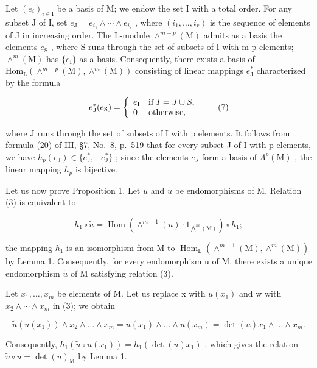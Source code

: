 Let \((e_{i})_{i\in\mathrm{I}}\) be a basis of M; we endow the set I with a total order. For any subset J of I, set \(e_{\mathrm{J}}=e_{i_{1}}\wedge\cdots\wedge e_{i_{r}}\) , where \((i_{1},\ldots,i_{r})\) is the sequence of elements of J in increasing order. The L-module \(\wedge^{m-p}(\mathrm{M})\) admits as a basis the elements \(e_{\mathrm{S}}\) , where S runs through the set of subsets of I with m-p elements; \(\wedge^{m}(\mathrm{M})\) has \(\{e_{\mathrm{I}}\}\) as a basis. Consequently, there exists a basis of \(\mathrm{Hom}_{\mathrm{L}}(\wedge^{m-p}(\mathrm{M}),\wedge^{m}(\mathrm{M}))\) consisting of linear mappings \(e_{\mathrm{J}}^{*}\) characterized by the formula

\[
e _ {\mathrm{J}} ^ {*} (e _ {\mathrm{S}}) = \left\{ \begin{array}{l l} e _ {\mathrm{I}} & \text {if } I = J\cup S, \\ 0 & \text {otherwise}, \end{array} \right.\tag{7}
\]

where J runs through the set of subsets of I with p elements. It follows from formula (20) of III, §7, No.~8, p.~519 that for every subset J of I with p elements, we have \(h_{p}(e_{\mathrm{J}}) \in \{e_{\mathrm{J}}^{*}, -e_{\mathrm{J}}^{*}\}\) ; since the elements \(e_{J}\) form a basis of \(\Lambda^{p}(\mathrm{M})\) , the linear mapping \(h_{p}\) is bijective.

Let us now prove Proposition 1. Let \(u\) and \(\widetilde{u}\) be endomorphisms of M. Relation (3) is equivalent to

\[
h _ {1} \circ \widetilde {u} = \operatorname{Hom} (\wedge^ {m - 1} (u) \cdot 1 _ {\bigwedge^ {m} (\mathrm{M})}) \circ h _ {1};\tag{8}
\]

the mapping \(h_{1}\) is an isomorphism from M to \(\operatorname{Hom}_{\mathrm{L}}(\wedge^{m-1}(\mathrm{M}),\wedge^{m}(\mathrm{M}))\) by Lemma 1. Consequently, for every endomorphism u of M, there exists a unique endomorphism \(\widetilde{u}\) of M satisfying relation (3).

Let \(x_{1},\ldots,x_{m}\) be elements of M. Let us replace x with \(u(x_{1})\) and w with \(x_{2}\wedge\cdots\wedge x_{m}\) in (3); we obtain

\[
\widetilde {u} (u (x _ {1})) \wedge x _ {2} \wedge \dots \wedge x _ {m} = u (x _ {1}) \wedge \dots \wedge u (x _ {m}) = \det (u) x _ {1} \wedge \dots \wedge x _ {m}.
\]

Consequently, \(h_1(\widetilde{u} \circ u(x_1)) = h_1(\det(u)x_1)\) , which gives the relation \(\widetilde{u} \circ u = \det(u)_\mathrm{M}\) by Lemma 1.

